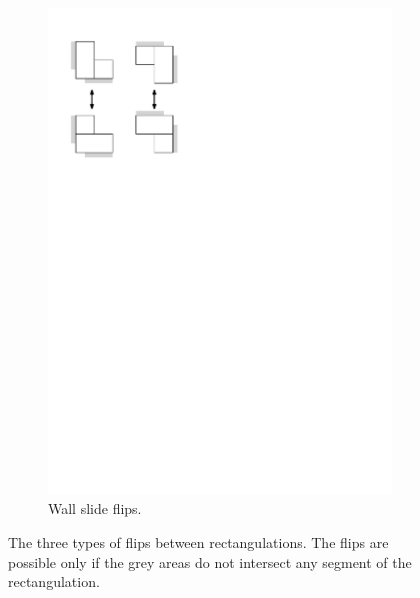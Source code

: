 \documentclass{amsart}
\theoremstyle{definition}
\begin{document}
\begin{figure}
\begin{center}
\begin{subfigure}{0.3\textwidth}
\begin{center}
    \includegraphics[page=3, scale=.5]{flipGraph.pdf}
    \caption{\label{fig:wallSlides}Wall slide flips.}
    \end{center}
    \end{subfigure}
    \end{center}
	\caption{The three types of flips between rectangulations. The flips are possible only if the grey areas do not intersect any segment of the rectangulation.}
	\label{fig:flips}
\end{figure}
\end{document}
